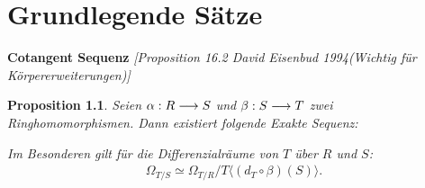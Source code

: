 \documentclass[10pt,a4paper]{report}
\newcommand{\ModulsOfDifferenzials}{David Eisenbud 1994}
\newcounter{Aussage}[chapter]
\newtheorem{prop}[Aussage]{Proposition}
\newcommand{\functionfront}[3]{\nolinebreak{#1:#2 \longrightarrow #3}}
\newcommand{\divR}[2]{\Omega_{#1/#2}}
\newcommand{\divf}[1]{d_{#1}}
\newcommand{\Tensor}[3]{#1 \otimes_{#2} #3}
\newcommand{\tensor}[3]{#1 \otimes #3}
\begin{document}
\chapter{Grundlegende Sätze}

\textbf{Cotangent Sequenz} \textit{[Proposition 16.2 \ModulsOfDifferenzials (Wichtig für Körpererweiterungen)]}
\begin{prop}\label{Cotangent Sequenz}
Seien $\functionfront{\alpha}{R}{S}$ und $\functionfront{\beta}{S}{T}$ zwei Ringhomomorphismen. Dann existiert folgende Exakte Sequenz:
\begin{center}
\end{center}
Im Besonderen gilt für die Differenzialräume von $T$ über $R$ und $S$:
\begin{gather*}
\divR{T}{S} \simeq \divR{T}{R}/T \langle (\divf{T} \circ \beta)(S)\rangle.
\end{gather*}
\end{prop}
\end{document}
